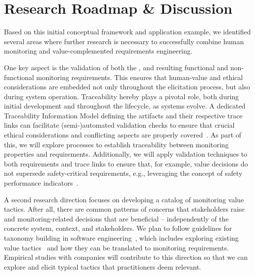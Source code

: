 \section{Research Roadmap \& Discussion}
\label{sec:roadmap}


Based on this initial conceptual framework and application example, we identified several areas where further research is necessary to successfully combine human monitoring and value-complemented requirements engineering.

 One key aspect is the validation of both the \muc, and resulting functional and non-functional monitoring requirements.  This ensures that human-value and ethical considerations are embedded not only throughout the elicitation process, but also during system operation. 
Traceability hereby plays a pivotal role, both during initial development and throughout the lifecycle, as systems evolve. A dedicated Traceability Information Model defining the artifacts and their respective trace links can facilitate {(semi-)automated} validation checks to ensure that crucial ethical considerations and conflicting aspects are properly covered~\cite{mader2009getting}.
As part of this, we will explore processes to establish traceability between monitoring properties and requirements. Additionally, we will apply validation techniques to both requirements and trace links to ensure that, for example, value decisions do not supersede safety-critical requirements, e.g., leveraging the concept of safety performance indicators~\cite{koopman2020positive}. %

 A second research direction focuses on developing a catalog of monitoring value tactics. After all, there are common patterns of concerns that stakeholders raise and monitoring-related decisions that are beneficial -- independently of the concrete system, context, and stakeholders. We plan to follow guidelines for taxonomy building in software engineering~\cite{usman2017taxonomies}, which includes exploring existing value tactics~\cite{wohlrab2024Supporting} and how they can be translated to monitoring requirements. %
Empirical studies with companies will contribute to this direction so that we can explore and elicit typical tactics that practitioners deem relevant.

